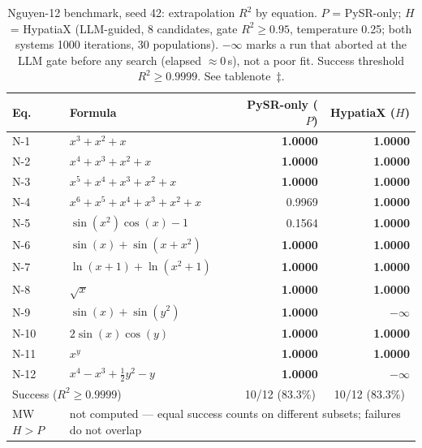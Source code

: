 \documentclass[twoside,11pt]{article}
\newcommand{\Rsq}{R^{2}}
\begin{document}
\begin{table}[h]
\centering
\caption{Nguyen-12 benchmark, seed 42: extrapolation $\Rsq$ by equation.
$P$ = PySR-only; $H$ = HypatiaX (LLM-guided, 8 candidates, gate $\Rsq\ge0.95$,
temperature 0.25; both systems 1000 iterations, 30 populations).
$-\infty$ marks a run that aborted at the LLM gate before any
search (elapsed $\approx0$\,s), not a poor fit. Success threshold
$\Rsq\ge0.9999$. See tablenote~$\ddag$.}
\label{tab:nguyen12}
\begin{threeparttable}
\begin{tabular}{llrr}
\toprule
Eq. & Formula & PySR-only ($P$) & HypatiaX ($H$) \\
\midrule
N-1  & $x^3 + x^2 + x$                              & \textbf{1.0000} & \textbf{1.0000} \\
N-2  & $x^4 + x^3 + x^2 + x$                         & \textbf{1.0000} & \textbf{1.0000} \\
N-3  & $x^5 + x^4 + x^3 + x^2 + x$                   & \textbf{1.0000} & \textbf{1.0000} \\
N-4  & $x^6 + x^5 + x^4 + x^3 + x^2 + x$              & 0.9969          & \textbf{1.0000} \\
N-5  & $\sin(x^2)\cos(x)-1$                          & 0.1564          & \textbf{1.0000} \\
N-6  & $\sin(x)+\sin(x+x^2)$                         & \textbf{1.0000} & \textbf{1.0000} \\
N-7  & $\ln(x+1)+\ln(x^2+1)$                         & \textbf{1.0000} & \textbf{1.0000} \\
N-8  & $\sqrt{x}$                                    & \textbf{1.0000} & \textbf{1.0000} \\
N-9  & $\sin(x)+\sin(y^2)$                           & \textbf{1.0000} & $-\infty$ \\
N-10 & $2\sin(x)\cos(y)$                             & \textbf{1.0000} & \textbf{1.0000} \\
N-11 & $x^y$                                         & \textbf{1.0000} & \textbf{1.0000} \\
N-12 & $x^4 - x^3 + \tfrac{1}{2}y^2 - y$              & \textbf{1.0000} & $-\infty$ \\
\midrule
\multicolumn{2}{l}{Success ($\Rsq\ge0.9999$)}
  & \multicolumn{1}{c}{10/12 (83.3\%)}
  & \multicolumn{1}{c}{10/12 (83.3\%)} \\
MW $H>P$   & \multicolumn{3}{l}{not computed --- equal success counts on different subsets; failures do not overlap} \\

\end{tabular}
\end{threeparttable}
\end{table}
\end{document}
